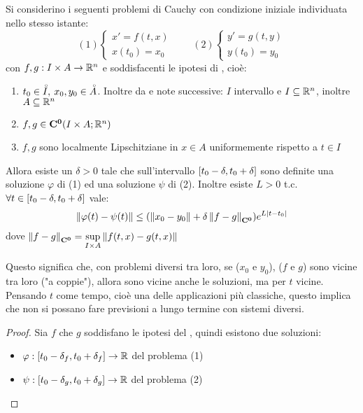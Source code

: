 \begin{theorem}
	\label{teo:cau_locale_part_2}
	Si considerino i seguenti problemi di Cauchy con condizione iniziale individuata nello stesso istante:
	\begin{equation}
		\label{eq:ipot_cau_part_2}
		(1)\begin{cases}x'=f(t,x)\\x(t_0)=x_0\end{cases}\qquad
		(2)\begin{cases}y'=g(t,y)\\y(t_0)=y_0\end{cases}
	\end{equation}
	con $f,g:I\times A \to \mathbb{R}^n$ e soddisfacenti le ipotesi di , cioè:
	\begin{enumerate}
		\item $t_0\in \accentset{\circ}{I},\:x_0,y_0\in \accentset{\circ}{A}$. Inoltre da  e note successive: $I$ intervallo e $I\subseteq \mathbb{R}^n$, inoltre $A\subseteq \mathbb{R}^n$
		\item $f,g\in \mathbf{C^{0}}(I\times A; \mathbb{R}^n)$
		\item $f,g$ sono localmente Lipschitziane in $x\in A$ uniformemente rispetto a $t\in I$
	\end{enumerate}
	Allora esiste un $\delta >0$ tale che sull'intervallo $\left[t_0-\delta,t_0+\delta\right]$ sono definite una soluzione $\varphi$ di (1) ed una soluzione $\psi$ di (2). Inoltre esiste $L>0$ t.c. $\forall t\in \left[t_0-\delta,t_0+\delta\right]$ vale:
	\[\left\|\varphi(t)-\psi(t)\right\|  \leq (\left\|x_0-y_0\right\|+\delta\left\|f-g\right\|_{\mathbf{C^{0}}})e^{L\left|t-t_0\right|}\]
	dove $\left\|f-g\right\|_{\mathbf{C^{0}}}=\sup\limits_{I\times A}\left\|f(t,x)-g(t,x)\right\|$
	\begin{note}
		Questo significa che, con problemi diversi tra loro, se ($x_0$ e $y_0$), ($f$ e $g$) sono vicine tra loro ("a coppie"), allora sono vicine anche le soluzioni, ma per $t$ vicine.
		Pensando $t$ come tempo, cioè una delle applicazioni più classiche, questo implica che non si possano fare previsioni a lungo termine con sistemi diversi.
	\end{note}
	\begin{proof}
		Sia $f$ che $g$ soddisfano le ipotesi del , quindi esistono due soluzioni:
		\begin{itemize}
			\item $\varphi:\left[t_0-\delta_f,t_0+\delta_f\right]\to \mathbb{R}$ del problema (1)
			\item $\psi:\left[t_0-\delta_g,t_0+\delta_g\right]\to \mathbb{R}$ del problema (2)

\end{itemize}
\end{proof}
\end{theorem}
